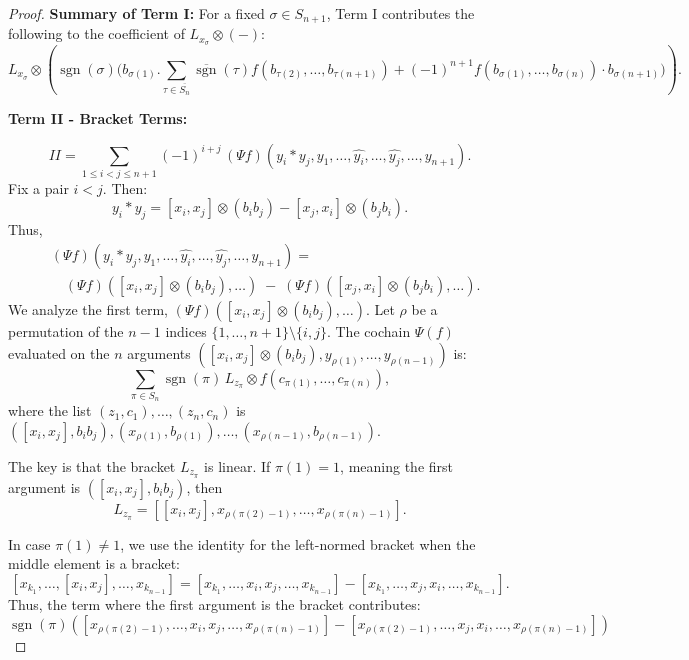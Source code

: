 \documentclass[10pt,a4paper]{amsart}
\begin{document}
\begin{proof}
\textbf{Summary of Term I:}
For a fixed \(\sigma \in S_{n+1}\), Term I contributes the following to the coefficient of \(L_{x_\sigma} \otimes (-)\):
\[
L_{x_\sigma} \otimes \left(\operatorname{sgn}(\sigma) \Big( b_{\sigma(1)}.  \sum_{\tau \in \overline{S_{n}}}\overline{\operatorname{sgn}}(\tau)f(b_{\tau(2)}, \dots, b_{\tau(n+1)})+ (-1)^{n+1} f(b_{\sigma(1)}, \dots, b_{\sigma(n)}) \cdot b_{\sigma(n+1)} \Big) \right). \tag{I}
\]




\textbf{ Term II - Bracket Terms:}

\[
II = \sum_{1 \leq i < j \leq n+1} (-1)^{i+j} \, (\Psi f)(y_i \ast y_j, y_1, \dots, \widehat{y_i}, \dots, \widehat{y_j}, \dots, y_{n+1}).
\]
Fix a pair \(i < j\). Then:
\[
y_i \ast y_j = [x_i, x_j] \otimes (b_i b_j) - [x_j, x_i] \otimes (b_j b_i).
\]
Thus,
\[
\begin{aligned}
&(\Psi f)(y_i \ast y_j, y_1, \dots, \widehat{y_i}, \dots, \widehat{y_j}, \dots, y_{n+1}) = \\
&\quad (\Psi f)([x_i, x_j] \otimes (b_i b_j), \dots) \;-\; (\Psi f)([x_j, x_i] \otimes (b_j b_i), \dots).
\end{aligned}
\]
We analyze the first term, \((\Psi f)([x_i, x_j] \otimes (b_i b_j), \dots)\). Let \(\rho\) be a permutation of the \(n-1\) indices \(\{1, \dots, n+1\} \setminus \{i, j\}\). The cochain \(\Psi(f)\) evaluated on the \(n\) arguments \(([x_i, x_j] \otimes (b_i b_j), y_{\rho(1)}, \dots, y_{\rho(n-1)})\) is:
\[
\sum_{\pi \in S_n} \operatorname{sgn}(\pi) \, L_{z_\pi} \otimes f(c_{\pi(1)}, \dots, c_{\pi(n)}),
\]
where the list \((z_1, c_1), \dots, (z_n, c_n)\) is \(([x_i, x_j], b_i b_j), (x_{\rho(1)}, b_{\rho(1)}), \dots, (x_{\rho(n-1)}, b_{\rho(n-1)})\).

The key is that the bracket \(L_{z_\pi}\) is linear. If \(\pi(1) = 1\), meaning the first argument is \(([x_i, x_j], b_i b_j)\), then
\[
L_{z_\pi} = [[x_i, x_j], x_{\rho(\pi(2)-1)}, \dots, x_{\rho(\pi(n)-1)}].
\]

















 In case  \(\pi(1) \neq 1\), we use the identity for the left-normed bracket when the middle element is a bracket:
\[
[ x_{k_1}, \dots,[x_i, x_j],\dots, x_{k_{n-1}}] = [ x_{k_1}, \dots, x_i,x_j,\dots, x_{k_{n-1}}] - [ x_{k_1}, \dots, x_j,x_i,\dots, x_{k_{n-1}}].
\]
Thus, the term where the first argument is the bracket contributes:
\[
\operatorname{sgn}(\pi) \left( [ x_{\rho(\pi(2)-1)}, \dots,x_i, x_j, \dots, x_{\rho(\pi(n)-1)}] - [ x_{\rho(\pi(2)-1)}, \dots, x_j, x_i,\dots, x_{\rho(\pi(n)-1)}] \right)
\]


\end{proof}
\end{document}
